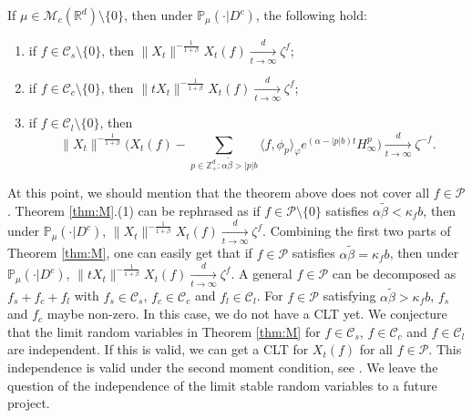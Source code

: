 \documentclass[EJP]{ejpecp} %
\begin{document}
\begin{theorem}
\label{thm:M}
	If $\mu\in \mathcal M_c(\mathbb R^d)\setminus \{0\}$, then under $\mathbb{P}_{\mu}(\cdot|D^c)$, the following hold:
\begin{enumerate}
\item \label{thm:M:1}
  	if $f\in \mathcal C_s\setminus\{0\}$, then $\|X_t\|^{- \frac{1}{1+\beta}} X_t(f)  \xrightarrow[t\to \infty]{d} \zeta^f$;
\item \label{thm:M:2}
  	if $f\in \mathcal C_c\setminus\{0\}$, then $ \|t X_t\|^{-\frac{1}{1+\beta}} X_t(f) \xrightarrow[t\to \infty]{d} \zeta^f$;
\item \label{thm:M:3}
  	if $f\in \mathcal C_l\setminus\{0\}$, then
\[
    \|X_t\|^{-\frac{1}{1+\beta}} \Big( X_t(f) - \sum_{p\in \mathbb Z^d_+:\alpha \tilde \beta>|p|b}\langle f,\phi_p\rangle_\varphi e^{(\alpha-|p|b)t}H^p_{\infty}\Big)
    \xrightarrow[t\to \infty]{d}
    \zeta^{-f}.
\]
\end{enumerate}
\end{theorem}

	At this point, we should mention that the theorem above does not cover all $f\in \mathcal P$.
	Theorem \ref{thm:M}.(1) can be rephrased as if $f\in \mathcal P\setminus\{0\}$ satisfies   $\alpha \tilde \beta < \kappa_f b$, then  under $\mathbb{P}_{\mu}(\cdot|D^c)$, $\|X_t\|^{- \frac{1}{1+\beta}} X_t(f)  \xrightarrow[t\to \infty]{d} \zeta^f$.
	Combining the first two parts of Theorem \ref{thm:M}, one can easily get that  if $f\in \mathcal P$ satisfies   $\alpha \tilde \beta = \kappa_f b$, then  under $\mathbb{P}_{\mu}(\cdot|D^c)$, $\|t X_t\|^{-\frac{1}{1+\beta}} X_t(f) \xrightarrow[t\to \infty]{d} \zeta^f$.
	A general  $f \in \mathcal P$ can be decomposed as $f_s + f_c + f_l$ with $f_s \in \mathcal C_s$, $f_c \in \mathcal C_c$ and $f_l \in \mathcal C_l$.
	For $f\in  \mathcal P$ satisfying $\alpha \tilde \beta > \kappa_f b$, $f_s$ and $f_c$
	maybe non-zero.
	In this case, we do not have a CLT yet.
	We conjecture that the limit random variables in Theorem \ref{thm:M} for $ f\in \mathcal C_s$, $f\in \mathcal C_c$ and $ f\in \mathcal C_l$ are independent. If this is valid, we can get a CLT for $ X_t(f)$ for all $f\in  \mathcal P$.
	This independence is valid  under the second moment condition, see \cite{RenSongZhang2015Central}.
	We leave the question of the independence of the limit stable random variables to a future project.
\end{document}
